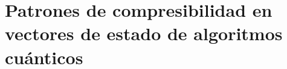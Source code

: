 \section{Patrones de compresibilidad en vectores de estado de algoritmos cuánticos}
\label{sec:patrones_vectores_estado_compresion}








